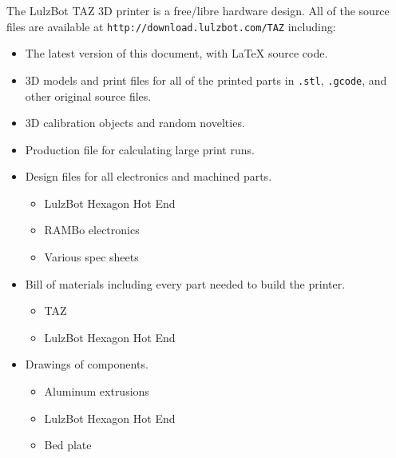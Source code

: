 %
%
%
%
%

The LulzBot\textsuperscript{\miniscule{\textregistered}} TAZ 3D printer is a free/libre hardware design. All of the source files are available at \texttt{http://download.lulzbot.com/TAZ} including:

\begin{itemize}
\item The latest version of this document, with {\LaTeX} source code.

\item 3D models and print files for all of the printed parts in \texttt{.stl}, \texttt{.gcode}, and other original source files.

\item 3D calibration objects and random novelties.

\item Production file for calculating large print runs.

\item Design files for all electronics and machined parts.

\begin{itemize} %
\item LulzBot\textsuperscript{\miniscule{\textregistered}} Hexagon Hot End
\item RAMBo electronics
\item Various spec sheets
\end{itemize} %

\item Bill of materials including every part needed to build the printer.
\begin{itemize} %
\item TAZ
\item LulzBot Hexagon Hot End
\end{itemize} %

\item Drawings of components.
\begin{itemize} %
\item Aluminum extrusions
\item LulzBot Hexagon Hot End
\item Bed plate
\end{itemize} %


\end{itemize}
